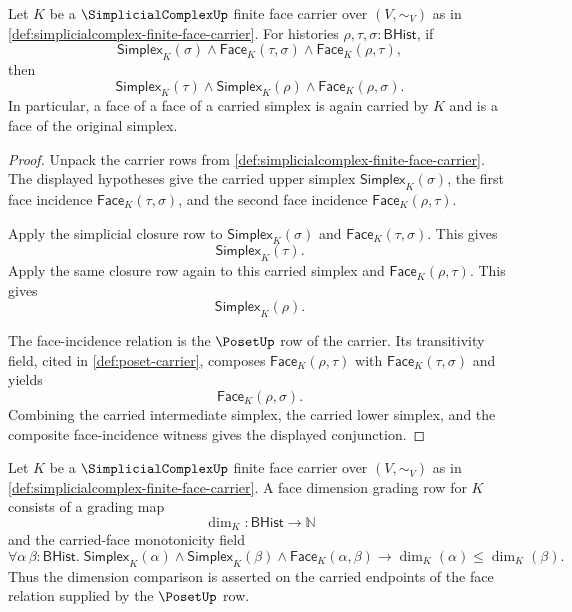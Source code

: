 \begin{theorem}
\label{thm:simplicialcomplex-face-chain-closure}
Let $K$ be a $\SimplicialComplexUp$ finite face carrier over $(V,\sim_V)$ as in \autoref{def:simplicialcomplex-finite-face-carrier}. For histories $\rho,\tau,\sigma:\mathsf{BHist}$, if
$$
\mathsf{Simplex}_K(\sigma)
\land
\mathsf{Face}_K(\tau,\sigma)
\land
\mathsf{Face}_K(\rho,\tau),
$$
then
$$
\mathsf{Simplex}_K(\tau)
\land
\mathsf{Simplex}_K(\rho)
\land
\mathsf{Face}_K(\rho,\sigma).
$$
In particular, a face of a face of a carried simplex is again carried by $K$ and is a face of the original simplex.
\end{theorem}
\begin{proof}
Unpack the carrier rows from \autoref{def:simplicialcomplex-finite-face-carrier}. The displayed hypotheses give the carried upper simplex $\mathsf{Simplex}_K(\sigma)$, the first face incidence $\mathsf{Face}_K(\tau,\sigma)$, and the second face incidence $\mathsf{Face}_K(\rho,\tau)$.

Apply the simplicial closure row to $\mathsf{Simplex}_K(\sigma)$ and $\mathsf{Face}_K(\tau,\sigma)$. This gives
$$
\mathsf{Simplex}_K(\tau).
$$
Apply the same closure row again to this carried simplex and $\mathsf{Face}_K(\rho,\tau)$. This gives
$$
\mathsf{Simplex}_K(\rho).
$$

The face-incidence relation is the $\PosetUp$ row of the carrier. Its transitivity field, cited in \autoref{def:poset-carrier}, composes $\mathsf{Face}_K(\rho,\tau)$ with $\mathsf{Face}_K(\tau,\sigma)$ and yields
$$
\mathsf{Face}_K(\rho,\sigma).
$$
Combining the carried intermediate simplex, the carried lower simplex, and the composite face-incidence witness gives the displayed conjunction.
\end{proof}

\begin{definition}
\label{def:simplicialcomplex-face-dimension-grading-row}
Let $K$ be a $\SimplicialComplexUp$ finite face carrier over $(V,\sim_V)$ as in \autoref{def:simplicialcomplex-finite-face-carrier}. A face dimension grading row for $K$ consists of a grading map
$$
\dim_K:\mathsf{BHist}\to\mathbb{N}
$$
and the carried-face monotonicity field
$$
\forall \alpha\,\beta:\mathsf{BHist}.\;
\mathsf{Simplex}_K(\alpha)\land
\mathsf{Simplex}_K(\beta)\land
\mathsf{Face}_K(\alpha,\beta)
\to
\dim_K(\alpha)\le \dim_K(\beta).
$$
Thus the dimension comparison is asserted on the carried endpoints of the face relation supplied by the $\PosetUp$ row.
\end{definition}

